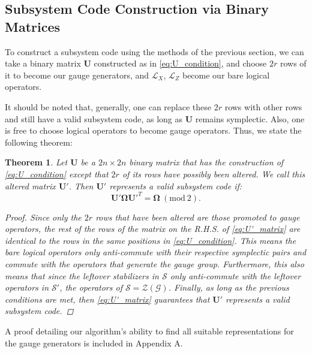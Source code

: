 \documentclass[conference]{IEEEtran}
\newtheorem{theorem}{Theorem}
\begin{document}
\subsection{Subsystem Code Construction via Binary Matrices}



To construct a subsystem code using the methods of the previous section, we can take a binary matrix $\boldsymbol{U}$ constructed as in \eqref{eq:U_condition}, and choose $2r$ rows of it to become our gauge generators, and $\mathcal{L}_{X}$, $\mathcal{L}_{Z}$ become our bare logical operators. 

It should be noted that, generally, one can replace these $2r$ rows with other rows and still have a valid subsystem code, as long as $\boldsymbol{U}$ remains symplectic. 
Also, one is free to choose logical operators to become gauge operators. 
Thus, we state the following theorem: 

\begin{theorem} 
Let $\boldsymbol{U}$ be a $2n \times 2n$ binary matrix that has the construction of  \eqref{eq:U_condition} except that  $2r$ of its rows have possibly been altered. We call this altered matrix $\boldsymbol{U}'$. 
Then $\boldsymbol{U}'$ represents a valid subsystem code if:
\begin{equation}
\label{eq:U'_matrix}\boldsymbol{U'}\boldsymbol{\Omega}\boldsymbol{U}'^T=\boldsymbol{\Omega} \ (\mathrm{mod} \ 2).
\end{equation}
\begin{proof}
Since only the $2r$ rows that have been altered are those promoted to gauge operators, the rest of the rows of the matrix on the R.H.S. of \eqref{eq:U'_matrix} are identical to the rows in the same positions in \eqref{eq:U_condition}. This means the bare logical operators only anti-commute with their respective symplectic pairs and commute with the operators that generate the gauge group. Furthermore, this also means that since the leftover stabilizers in $\mathcal{S}$ only anti-commute with the leftover operators in $\mathcal{S}'$, the operators of $\mathcal{S}=\mathcal{Z}(\mathcal{G})$. Finally, as long as the previous conditions are met, then \eqref{eq:U'_matrix} guarantees that $\boldsymbol{U}'$ represents a valid subsystem code.
\end{proof}

\end{theorem}
A proof detailing our algorithm's ability to find all suitable representations for the gauge generators is included in Appendix A.
\end{document}
